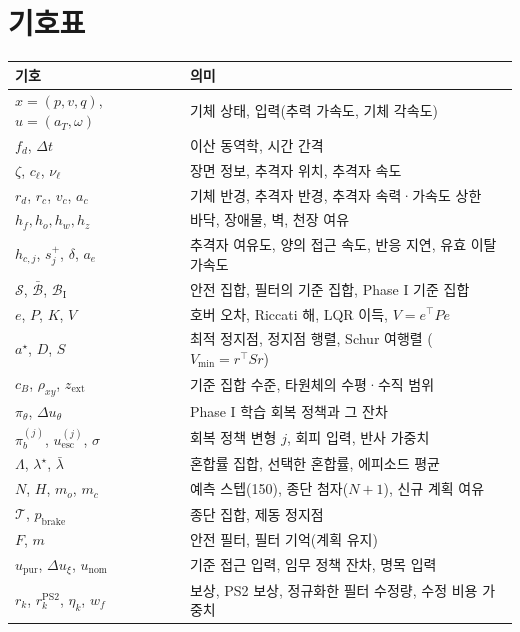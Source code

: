 \documentclass[10pt,a4paper]{article}
\newcommand{\Safe}{\mathcal{S}}
\newcommand{\Base}{\bar{\mathcal{B}}}
\newcommand{\BaseP}{\mathcal{B}_{\mathrm{I}}}
\newcommand{\Term}{\mathcal{T}}
\newcommand{\unom}{u_{\mathrm{nom}}}
\newcommand{\upur}{u_{\mathrm{pur}}}
\newcommand{\uesc}{u_{\mathrm{esc}}}
\begin{document}
\section{기호표}\label{app:symbols}
\begin{center}\small
\begin{tabularx}{\linewidth}{>{\raggedright\arraybackslash}p{3.4cm}X}\toprule
기호 & 의미 \\\midrule
$x=(p,v,q)$, $u=(a_T,\omega)$ & 기체 상태, 입력(추력 가속도, 기체 각속도) \\
$f_d$, $\Delta t$ & 이산 동역학, 시간 간격 \\
$\zeta$, $c_\ell$, $\nu_\ell$ & 장면 정보, 추격자 위치, 추격자 속도 \\
$r_d$, $r_c$, $v_c$, $a_c$ & 기체 반경, 추격자 반경, 추격자 속력·가속도 상한 \\
$h_f,h_o,h_w,h_z$ & 바닥, 장애물, 벽, 천장 여유 \\
$h_{c,j}$, $s_j^+$, $\delta$, $a_e$ & 추격자 여유도, 양의 접근 속도, 반응 지연, 유효 이탈 가속도 \\
$\Safe$, $\Base$, $\BaseP$ & 안전 집합, 필터의 기준 집합, Phase I 기준 집합 \\
$e$, $P$, $K$, $V$ & 호버 오차, Riccati 해, LQR 이득, $V=e^\top Pe$ \\
$a^\star$, $D$, $S$ & 최적 정지점, 정지점 행렬, Schur 여행렬 ($V_{\min}=r^\top Sr$) \\
$c_B$, $\rho_{xy}$, $z_{\mathrm{ext}}$ & 기준 집합 수준, 타원체의 수평·수직 범위 \\
$\pi_\theta$, $\Delta u_\theta$ & Phase I 학습 회복 정책과 그 잔차 \\
$\pi_b^{(j)}$, $\uesc^{(j)}$, $\sigma$ & 회복 정책 변형 $j$, 회피 입력, 반사 가중치 \\
$\Lambda$, $\lambda^\star$, $\bar\lambda$ & 혼합률 집합, 선택한 혼합률, 에피소드 평균 \\
$N$, $H$, $m_o$, $m_c$ & 예측 스텝(150), 종단 첨자($N+1$), 신규 계획 여유 \\
$\Term$, $p_{\mathrm{brake}}$ & 종단 집합, 제동 정지점 \\
$F$, $m$ & 안전 필터, 필터 기억(계획 유지) \\
$\upur$, $\Delta u_\xi$, $\unom$ & 기준 접근 입력, 임무 정책 잔차, 명목 입력 \\
$r_k$, $r^{\mathrm{PS2}}_k$, $\eta_k$, $w_f$ & 보상, PS2 보상, 정규화한 필터 수정량, 수정 비용 가중치 \\\bottomrule
\end{tabularx}
\end{center}
\end{document}
